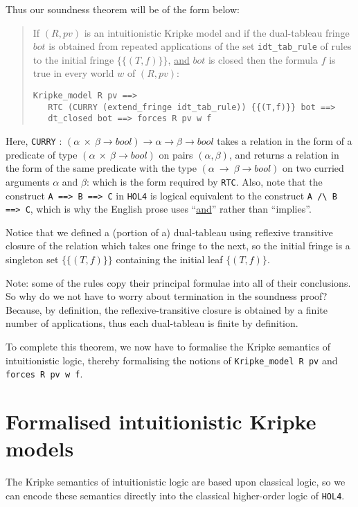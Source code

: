 \documentclass[a4paper]{article}
\newcommand{\hol}{\texttt{HOL4}}
\begin{document}
Thus our soundness theorem will be of the form below:
\begin{quote}
  If $(R, pv)$ is an intuitionistic Kripke model and if the
  dual-tableau fringe $bot$ is obtained from repeated
  applications of the set \texttt{idt\_tab\_rule} of rules to
  the initial fringe
  $\{\{(T,f)\}\}$, \underline{and} $bot$ is closed then the formula
  $f$ is true in every world $w$ of $(R, pv)$:
\begin{verbatim}
Kripke_model R pv ==>
   RTC (CURRY (extend_fringe idt_tab_rule)) {{(T,f)}} bot ==>
   dt_closed bot ==> forces R pv w f
\end{verbatim}
\end{quote}
Here, \texttt{CURRY} : $(\alpha ~\times ~\beta \to bool) \to
\alpha \to \beta \to bool$
takes a relation 
in the form of a predicate of type
$(\alpha ~\times ~\beta \to bool)$
on pairs
$(\alpha,\beta)$,
and returns a relation in the form of the same predicate 
with the type $(\alpha ~\to ~\beta \to bool)$ on two curried arguments
$\alpha$ and $\beta$: which is the form required by 
\texttt{RTC}.
Also, note that the construct
\texttt{A ==> B ==> C} in \hol{} is logical equivalent to the construct
\verb!A /\ B ==> C!, which is why the English prose uses
``\underline{and}'' rather than ``implies''.

Notice that we defined a (portion of a) dual-tableau using reflexive
transitive closure of the relation which takes one fringe to the next,
so the initial fringe is a singleton set 
$\{ \{(T, f)\} \}$
containing the initial leaf
$\{(T, f)\}$.

Note: some of the rules copy their principal formulae into all
of their conclusions. So why do we not have to worry about termination
in the soundness proof? Because, by definition, the
reflexive-transitive closure is obtained by a finite number of
applications, thus each dual-tableau is finite by definition. 

To complete this theorem, we now have to formalise the Kripke
semantics of intuitionistic logic, thereby formalising the notions of 
\texttt{Kripke\_model R pv} 
and 
\texttt{forces R pv w f}.

\section{Formalised  intuitionistic Kripke models}

The Kripke semantics of intuitionistic logic are based upon
classical logic, so we can encode these semantics directly into the
classical higher-order logic of \hol.
\end{document}
